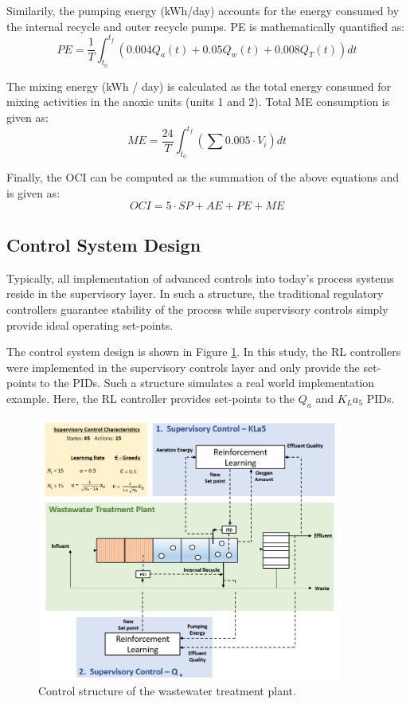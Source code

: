 Similarily, the pumping energy (kWh/day) accounts for the energy consumed by the internal recycle and outer recycle pumps.  PE is mathematically quantified as:
\begin{equation}
    PE = \frac{1}{T} \int_{t_0}^{t_f} (0.004 Q_a(t) + 0.05 Q_w(t) + 0.008 Q_T(t)) dt
\end{equation}

The mixing energy (kWh / day) is calculated as the total energy consumed for mixing activities in the anoxic units (units 1 and 2). Total ME consumption is given as:
\begin{equation}
    ME = \frac{24}{T} \int_{t_0}^{t_f} \left(\sum 0.005 \cdot V_i \right) dt
\end{equation}


Finally, the OCI can be computed as the summation of the above equations and is given as:
\begin{equation}
    OCI = 5 \cdot SP + AE + PE + ME
\end{equation}

\subsection{Control System Design}
Typically, all implementation of advanced controls into today's process systems reside in the supervisory layer. In such a structure, the traditional regulatory controllers guarantee stability of the process while supervisory controls simply provide ideal operating set-points.

The control system design is shown in Figure \ref{fig:04wwtp_rl}. In this study, the RL controllers were implemented in the supervisory controls layer and only provide the set-points to the PIDs. Such a structure simulates a real world implementation example. Here, the RL controller provides set-points to the $Q_a$ and $K_La_5$ PIDs.

\begin{figure}[H]
    \centering
    \includegraphics[width=0.9\textwidth]{images/ch4/supervisory_control.png}
    \caption{Control structure of the wastewater treatment plant.}
    \label{fig:04wwtp_rl}
\end{figure}

